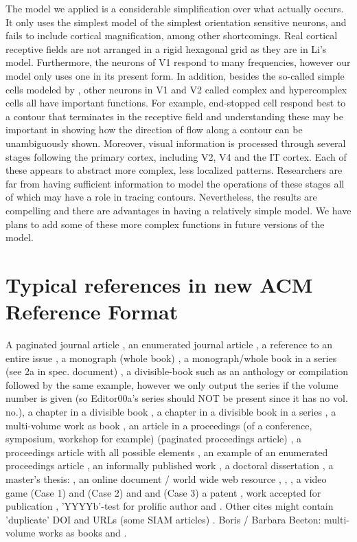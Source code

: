 \documentclass[prodmode,acmtap]{acmlarge}
\begin{document}
The model we applied is a considerable simplification over what
actually occurs. It only uses the simplest model of the simplest
orientation sensitive neurons, and fails to include cortical
magnification, among other shortcomings. Real cortical receptive
fields are not arranged in a rigid hexagonal grid as they are in Li's
model. Furthermore, the neurons of V1 respond to many frequencies,
however our model only uses one in its present form. In addition,
besides the so-called simple cells modeled by , other
neurons in V1 and V2 called complex and hypercomplex cells all have
important functions. For example, end-stopped cell respond best to a
contour that terminates in the receptive field and understanding
these may be important in showing how the direction of flow along a
contour can be unambiguously shown. Moreover, visual information is
processed through several stages following the primary cortex,
including V2, V4 and the IT cortex. Each of these appears to abstract
more complex, less localized patterns. Researchers are far from
having sufficient information to model the operations of these stages
all of which may have a role in tracing contours. Nevertheless, the
results are compelling and there are advantages in having a
relatively simple model. We have plans to add some of these more
complex functions in future versions of the model.


\section{Typical references in new ACM Reference Format}
A paginated journal article \cite{Abril07}, an enumerated
journal article \cite{Cohen07}, a reference to an entire issue \cite{JCohen96},
a monograph (whole book) \cite{Kosiur01}, a monograph/whole book in a series (see 2a in spec. document)
\cite{Harel79}, a divisible-book such as an anthology or compilation \cite{Editor00}
followed by the same example, however we only output the series if the volume number is given
\cite{Editor00a} (so Editor00a's series should NOT be present since it has no vol. no.),
a chapter in a divisible book \cite{Spector90}, a chapter in a divisible book
in a series \cite{Douglass98}, a multi-volume work as book \cite{Knuth97},
an article in a proceedings (of a conference, symposium, workshop for example)
(paginated proceedings article) \cite{Andler79}, a proceedings article
with all possible elements \cite{Smith10}, an example of an enumerated
proceedings article \cite{VanGundy07},
an informally published work \cite{Harel78}, a doctoral dissertation \cite{Clarkson85},
a master's thesis: \cite{anisi03}, an online document / world wide web resource \cite{Thornburg01}, \cite{Ablamowicz07},
\cite{Poker06}, a video game (Case 1) \cite{Obama08} and (Case 2) \cite{Novak03}
and \cite{Lee05} and (Case 3) a patent \cite{JoeScientist001},
work accepted for publication \cite{rous08}, 'YYYYb'-test for prolific author
\cite{SaeediMEJ10} and \cite{SaeediJETC10}. Other cites might contain
'duplicate' DOI and URLs (some SIAM articles) \cite{Kirschmer:2010:AEI:1958016.1958018}.
Boris / Barbara Beeton: multi-volume works as books
\cite{MR781536} and \cite{MR781537}.
\end{document}
